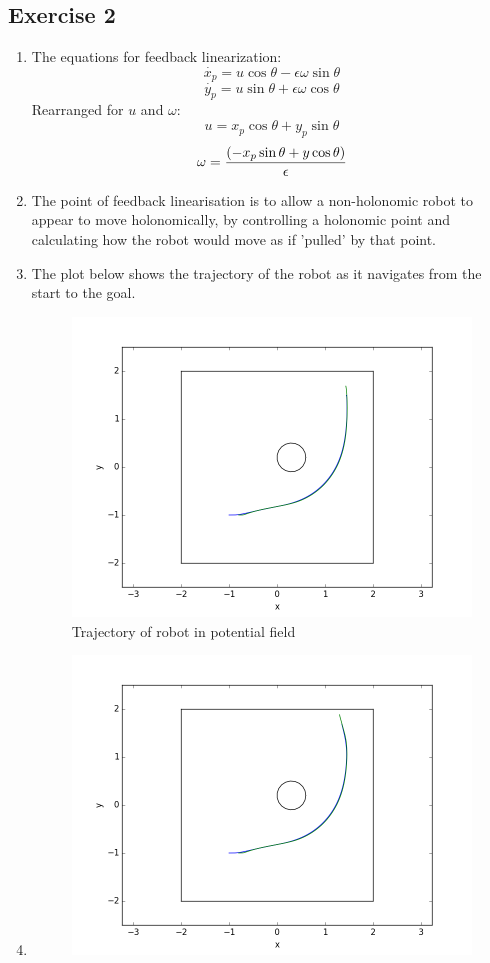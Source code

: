 \documentclass[12pt,a4paper]{article}
\begin{document}
\subsection*{Exercise 2}
\begin{enumerate}[label=(\alph*)]
	\item The equations for feedback linearization:
		$$\dot{x_p} = u\cos{\theta} - \epsilon \omega \sin{\theta}$$
		$$\dot{y_p} = u\sin{\theta} + \epsilon \omega \cos{\theta}$$
		Rearranged for $u$ and $\omega$:
		$$ u =x_p\cos{\theta} + y_p\sin{\theta} $$
		$$ \omega = {(-x_p\sin{\theta}+y\cos{\theta})\over{\epsilon}}$$
	\item The point of feedback linearisation is to allow a non-holonomic robot to appear to move holonomically, by controlling a holonomic point and calculating how the robot would move as if 'pulled' by that point.
	\item The plot below shows the trajectory of the robot as it navigates from the start to the goal.
	\begin{figure}[!h]
		\centering
		\includegraphics[width=\textwidth]{fig/2c.png}
		\caption{Trajectory of robot in potential field}
		\label{fig:trajectory}
	\end{figure}
	\item
	\begin{figure}[!h]
		\centering
		\includegraphics[width=\textwidth]{fig/2d.png}

\end{figure}
\end{enumerate}
\end{document}
